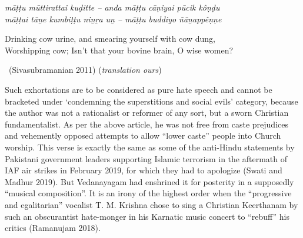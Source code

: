 \begin{myquote}
\textit{māṭṭu mūttirattai kuḍitte – anda māṭṭu cāṇiyai pūcik kôṇḍu\\ māṭṭai tāṉe kumbiṭṭu niṉṟa uṉ – māṭṭu buddiyo ñāṉappêṇṇe}
\end{myquote}

\begin{myquote}
\end{myquote}

\begin{myquote}
Drinking cow urine, and smearing yourself with cow dung,\\ Worshipping cow; Isn’t that your bovine brain, O wise women? 

~\hfill (Sivasubramanian 2011) (\textit{translation ours})
\end{myquote}

\newpage

Such exhortations are to be considered as pure hate speech and cannot be bracketed under ‘condemning the superstitions and social evils’ category, because the author was not a rationalist or reformer of any sort, but a sworn Christian fundamentalist. As per the above article, he was not free from caste prejudices and vehemently opposed attempts to allow “lower caste” people into Church worship. This verse is exactly the same as some of the anti-Hindu statements by Pakistani government leaders supporting Islamic terrorism in the aftermath of IAF air strikes in February 2019, for which they had to apologize (Swati and Madhur 2019). But Vedanayagam had enshrined it for posterity in a supposedly “musical composition”. It is an irony of the highest order when the “progressive and egalitarian” vocalist T. M. Krishna chose to sing a Christian Keerthanam by such an obscurantist hate-monger in his Karnatic music concert to “rebuff” his critics (Ramanujam 2018).

